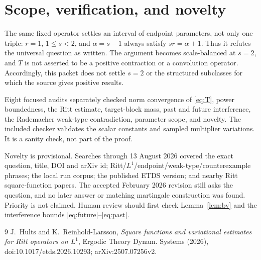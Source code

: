 \documentclass[11pt]{article}
\theoremstyle{remark}
\begin{document}
\section{Scope, verification, and novelty}

The same fixed operator settles an interval of endpoint parameters, not only
one triple: $r=1$, $1\leq s<2$, and $\alpha=s-1$ always satisfy
$sr=\alpha+1$.  Thus it refutes the universal question as written.  The
argument becomes scale-balanced at $s=2$, and $T$ is not asserted to be a
positive contraction or a convolution operator.  Accordingly, this packet
does not settle $s=2$ or the structured subclasses for which the source gives
positive results.

Eight focused audits separately checked norm convergence of \eqref{eq:T},
power boundedness, the Ritt estimate, target-block mass, past and future
interference, the Rademacher weak-type contradiction, parameter scope, and
novelty.  The included checker validates the scalar constants and sampled
multiplier variations.  It is a sanity check, not part of the proof.

Novelty is provisional.  Searches through 13 August 2026 covered the exact
question, title, DOI and arXiv id; Ritt/$L^1$/endpoint/weak-type/counterexample
phrases; the local run corpus; the published ETDS version; and nearby Ritt
square-function papers.  The accepted February 2026 revision still asks the
question, and no later answer or matching martingale construction was found.
Priority is not claimed.  Human review should first check
Lemma~\ref{lem:bv} and the interference bounds
\eqref{eq:future}--\eqref{eq:past}.

\begin{thebibliography}{9}
J.~Hults and K.~Reinhold-Larsson,
\emph{Square functions and variational estimates for Ritt operators on
$L^1$}, Ergodic Theory Dynam. Systems (2026),
doi:10.1017/etds.2026.10293; arXiv:2507.07256v2.
\end{thebibliography}
\end{document}
